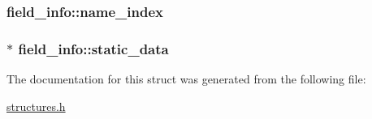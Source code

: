 \subsubsection[{\texorpdfstring{name\+\_\+index}{name_index}}]{ field\+\_\+info\+::name\+\_\+index}\hypertarget{structfield__info_a425e3ae85badd81c67ef00acca85ad9e}{}\label{structfield__info_a425e3ae85badd81c67ef00acca85ad9e}
\subsubsection[{\texorpdfstring{static\+\_\+data}{static_data}}]{$\ast$ field\+\_\+info\+::static\+\_\+data}\hypertarget{structfield__info_a90fc91c18e08fe2325cdeded20ee4578}{}\label{structfield__info_a90fc91c18e08fe2325cdeded20ee4578}


The documentation for this struct was generated from the following file\+:\begin{DoxyCompactItemize}
\item 
\hyperlink{structures_8h}{structures.\+h}\end{DoxyCompactItemize}
